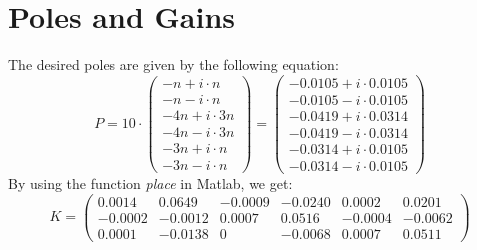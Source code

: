 \documentclass[11pt, a4paper]{article}
\begin{document}
\section{Poles and Gains}
The desired poles are given by the following equation:
\begin{equation}
    P = 10\cdot\begin{pmatrix}
        -n+i\cdot n\\-n-i\cdot n\\
        -4n+i\cdot 3n\\-4n-i\cdot 3n\\
        -3n+i\cdot n\\-3n-i\cdot n
    \end{pmatrix} = \begin{pmatrix}
        -0.0105+i\cdot0.0105\\ -0.0105-i\cdot0.0105\\
        -0.0419+i\cdot0.0314\\ -0.0419-i\cdot0.0314\\
        -0.0314+i\cdot0.0105\\ -0.0314-i\cdot0.0105
    \end{pmatrix}
\end{equation}
By using the function \emph{place} in Matlab, we get:
\begin{equation}
    K = \begin{pmatrix}
        0.0014&0.0649&-0.0009&-0.0240&0.0002&0.0201\\
        -0.0002&-0.0012&0.0007&0.0516&-0.0004&-0.0062\\
        0.0001&-0.0138&0&-0.0068&0.0007&0.0511
    \end{pmatrix}
\end{equation}
\end{document}
